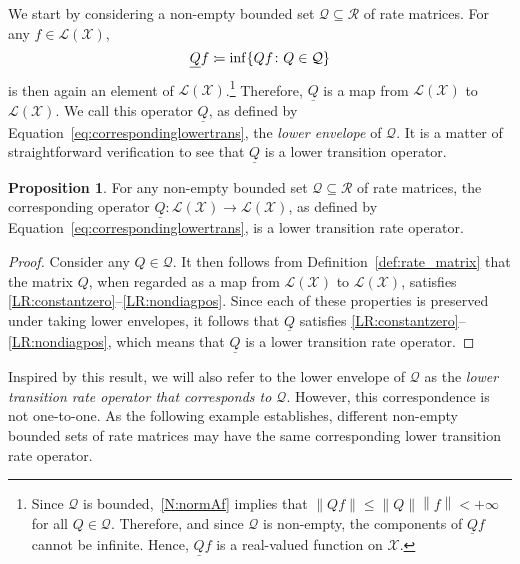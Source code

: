 \documentclass[10pt]{paper}
\theoremstyle{definition}
\newtheorem{proposition}[theorem]{Proposition}
\newcommand{\states}{\mathcal{X}}
\newcommand{\gambles}{\mathcal{L}}
\newcommand{\gamblesX}{\gambles(\states)}
\newcommand{\rateset}{\mathcal{Q}}
\newcommand{\lrate}{\underline{Q}}
\newcommand{\norm}[1]{\left\lVert #1 \right\rVert}
\newcommand{\coloneqq}{:\!=}
\begin{document}

We start by considering a non-empty bounded set $\rateset\subseteq\mathcal{R}$ of rate matrices. For any $f\in\gamblesX$,
\begin{equation}\label{eq:correspondinglowertrans}
\lrate f\coloneqq\inf\{Qf\colon Q\in\rateset\}\\[2mm]
\end{equation}
is then again an element of $\gamblesX$.\footnote{%
Since $\rateset$ is bounded,~\ref{N:normAf} implies that $\norm{Qf}\leq\norm{Q}\norm{f}<+\infty$ for all $Q\in\rateset$. Therefore, and since $\rateset$ is non-empty, the components of $\lrate f$ cannot be infinite. Hence, $\lrate f$ is a real-valued function on $\states$.}
Therefore, $\lrate$ is a map from $\gamblesX$ to $\gamblesX$. We call this operator $\lrate$, as defined by Equation~\eqref{eq:correspondinglowertrans}, the \emph{lower envelope} of $\rateset$. It is a matter of straightforward verification to see that $\lrate$ is a lower transition operator.

\begin{proposition}\label{prop:lowerenvelopeislowertrans}
For any non-empty bounded set $\rateset\subseteq\mathcal{R}$ of rate matrices, the corresponding operator $\lrate\colon\gamblesX\to\gamblesX$, as defined by Equation~\eqref{eq:correspondinglowertrans}, is a lower transition rate operator.
\end{proposition}
\begin{proof}
Consider any $Q\in\rateset$. It then follows from Definition~\ref{def:rate_matrix} that the matrix $Q$, when regarded as a map from $\gamblesX$ to $\gamblesX$, satisfies \ref{LR:constantzero}--\ref{LR:nondiagpos}. Since each of these properties is preserved under taking lower envelopes, it follows that $\lrate$ satisfies \ref{LR:constantzero}--\ref{LR:nondiagpos}, which means that $\lrate$ is a lower transition rate operator.
\end{proof}

\noindent
Inspired by this result, we will also refer to the lower envelope of $\rateset$ as the \emph{lower transition rate operator that corresponds to $\rateset$}. %
However, this correspondence is not one-to-one. As the following example establishes, different non-empty bounded sets of rate matrices may have the same corresponding lower transition rate operator.
\end{document}
